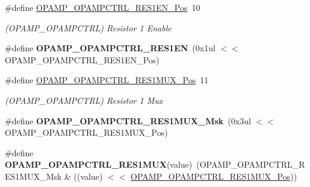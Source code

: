 \begin{DoxyCompactItemize}
\item 
\hypertarget{group___s_a_m_l21___o_p_a_m_p_gaffd814d2966d21b03f693451ddcedce8}{}\#define \hyperlink{group___s_a_m_l21___o_p_a_m_p_gaffd814d2966d21b03f693451ddcedce8}{O\+P\+A\+M\+P\+\_\+\+O\+P\+A\+M\+P\+C\+T\+R\+L\+\_\+\+R\+E\+S1\+E\+N\+\_\+\+Pos}~10\label{group___s_a_m_l21___o_p_a_m_p_gaffd814d2966d21b03f693451ddcedce8}

\begin{DoxyCompactList}\small\item\em (O\+P\+A\+M\+P\+\_\+\+O\+P\+A\+M\+P\+C\+T\+R\+L) Resistor 1 Enable \end{DoxyCompactList}\item 
\hypertarget{group___s_a_m_l21___o_p_a_m_p_ga3f4761d955d808ac18b1d2777e97867a}{}\#define {\bfseries O\+P\+A\+M\+P\+\_\+\+O\+P\+A\+M\+P\+C\+T\+R\+L\+\_\+\+R\+E\+S1\+E\+N}~(0x1ul $<$$<$ O\+P\+A\+M\+P\+\_\+\+O\+P\+A\+M\+P\+C\+T\+R\+L\+\_\+\+R\+E\+S1\+E\+N\+\_\+\+Pos)\label{group___s_a_m_l21___o_p_a_m_p_ga3f4761d955d808ac18b1d2777e97867a}

\item 
\hypertarget{group___s_a_m_l21___o_p_a_m_p_ga3e107e1a6a8a449a097c858ee7ba3001}{}\#define \hyperlink{group___s_a_m_l21___o_p_a_m_p_ga3e107e1a6a8a449a097c858ee7ba3001}{O\+P\+A\+M\+P\+\_\+\+O\+P\+A\+M\+P\+C\+T\+R\+L\+\_\+\+R\+E\+S1\+M\+U\+X\+\_\+\+Pos}~11\label{group___s_a_m_l21___o_p_a_m_p_ga3e107e1a6a8a449a097c858ee7ba3001}

\begin{DoxyCompactList}\small\item\em (O\+P\+A\+M\+P\+\_\+\+O\+P\+A\+M\+P\+C\+T\+R\+L) Resistor 1 Mux \end{DoxyCompactList}\item 
\hypertarget{group___s_a_m_l21___o_p_a_m_p_gaccb7f79850ea3707eef69bcfdf136405}{}\#define {\bfseries O\+P\+A\+M\+P\+\_\+\+O\+P\+A\+M\+P\+C\+T\+R\+L\+\_\+\+R\+E\+S1\+M\+U\+X\+\_\+\+Msk}~(0x3ul $<$$<$ O\+P\+A\+M\+P\+\_\+\+O\+P\+A\+M\+P\+C\+T\+R\+L\+\_\+\+R\+E\+S1\+M\+U\+X\+\_\+\+Pos)\label{group___s_a_m_l21___o_p_a_m_p_gaccb7f79850ea3707eef69bcfdf136405}

\item 
\hypertarget{group___s_a_m_l21___o_p_a_m_p_ga2b658b411abe487a5391fb498fb3ed02}{}\#define {\bfseries O\+P\+A\+M\+P\+\_\+\+O\+P\+A\+M\+P\+C\+T\+R\+L\+\_\+\+R\+E\+S1\+M\+U\+X}(value)~(O\+P\+A\+M\+P\+\_\+\+O\+P\+A\+M\+P\+C\+T\+R\+L\+\_\+\+R\+E\+S1\+M\+U\+X\+\_\+\+Msk \& ((value) $<$$<$ \hyperlink{group___s_a_m_l21___o_p_a_m_p_ga3e107e1a6a8a449a097c858ee7ba3001}{O\+P\+A\+M\+P\+\_\+\+O\+P\+A\+M\+P\+C\+T\+R\+L\+\_\+\+R\+E\+S1\+M\+U\+X\+\_\+\+Pos}))\label{group___s_a_m_l21___o_p_a_m_p_ga2b658b411abe487a5391fb498fb3ed02}


\end{DoxyCompactItemize}
